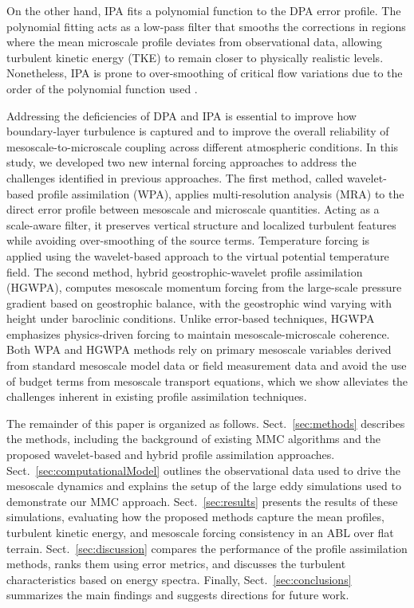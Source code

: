 On the other hand, IPA fits a polynomial function to the DPA error profile. The polynomial fitting acts as a low-pass filter that smooths the corrections in regions where the mean microscale profile deviates from observational data, allowing turbulent kinetic energy (TKE) to remain closer to physically realistic levels. Nonetheless, IPA is prone to over-smoothing of critical flow variations due to the order of the polynomial function used \citep{allaerts2020development}. 

Addressing the deficiencies of DPA and IPA is essential to improve how boundary-layer turbulence is captured and to improve the overall reliability of mesoscale-to-microscale coupling across different atmospheric conditions. In this study, we developed two new internal forcing approaches to address the challenges identified in previous approaches. The first method, called wavelet-based profile assimilation (WPA), applies multi-resolution analysis (MRA) \citep{mallat1989theory,debnath2017construction,singh2024impact} to the direct error profile between mesoscale and microscale quantities. Acting as a scale-aware filter, it preserves vertical structure and localized turbulent features while avoiding over-smoothing of the source terms. Temperature forcing is applied using the wavelet-based approach to the virtual potential temperature field. The second method, hybrid geostrophic-wavelet profile assimilation (HGWPA), computes mesoscale momentum forcing from the large-scale pressure gradient based on geostrophic balance, with the geostrophic wind varying with height under baroclinic conditions. Unlike error-based techniques, HGWPA emphasizes physics-driven forcing to maintain mesoscale-microscale coherence. Both WPA and HGWPA methods rely on primary mesoscale variables derived from standard mesoscale model data or field measurement data and avoid the use of budget terms from mesoscale transport equations, which we show alleviates the challenges inherent in existing profile assimilation techniques.

The remainder of this paper is organized as follows. Sect.~\ref{sec:methods} describes the methods, including the background of existing MMC algorithms and the proposed wavelet-based and hybrid profile assimilation approaches. Sect.~\ref{sec:computationalModel} outlines the observational data used to drive the mesoscale dynamics and explains the setup of the large eddy simulations used to demonstrate our MMC approach. Sect.~\ref{sec:results} presents the results of these simulations, evaluating how the proposed methods capture the mean profiles, turbulent kinetic energy, and mesoscale forcing consistency in an ABL over flat terrain. Sect.~\ref{sec:discussion} compares the performance of the profile assimilation methods, ranks them using error metrics, and discusses the turbulent characteristics based on energy spectra. Finally, Sect.~\ref{sec:conclusions} summarizes the main findings and suggests directions for future work.
